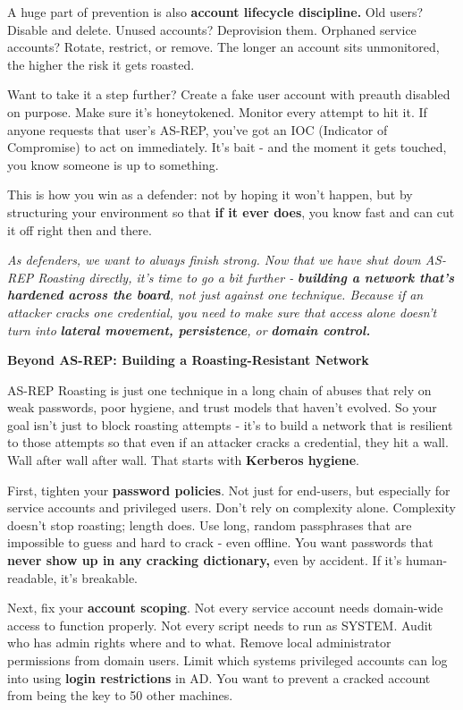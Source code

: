 A huge part of prevention is also \textbf{account lifecycle discipline. }Old users? Disable and delete. Unused accounts? Deprovision them. Orphaned service accounts? Rotate, restrict, or remove. The longer an account sits unmonitored, the higher the risk it gets roasted.

Want to take it a step further? Create a fake user account with preauth disabled on purpose. Make sure it’s honeytokened. Monitor every attempt to hit it. If anyone requests that user’s AS-REP, you’ve got an IOC (Indicator of Compromise) to act on immediately. It’s bait - and the moment it gets touched, you know someone is up to something.

This is how you win as a defender: not by hoping it won’t happen, but by structuring your environment so that \textbf{if it ever does}, you know fast and can cut it off right then and there.

\textit{As defenders, we want to always finish strong. Now that we have shut down AS-REP Roasting directly, it’s time to go a bit further - }\textit{\textbf{building a network that’s hardened across the board}}\textit{, not just against one technique. Because if an attacker cracks one credential, you need to make sure that access alone doesn’t turn into }\textit{\textbf{lateral movement, persistence}}\textit{, or }\textit{\textbf{domain control.}}

\textbf{Beyond AS-REP: Building a Roasting-Resistant Network}

AS-REP Roasting is just one technique in a long chain of abuses that rely on weak passwords, poor hygiene, and trust models that haven’t evolved. So your goal isn’t just to block roasting attempts - it’s to build a network that is resilient to those attempts so that even if an attacker cracks a credential, they hit a wall. Wall after wall after wall. That starts with \textbf{Kerberos hygiene}.

First, tighten your \textbf{password policies}. Not just for end-users, but especially for service accounts and privileged users. Don’t rely on complexity alone. Complexity doesn’t stop roasting; length does. Use long, random passphrases that are impossible to guess and hard to crack - even offline. You want passwords that \textbf{never show up in any cracking dictionary, }even by accident. If it’s human-readable, it’s breakable.

Next, fix your \textbf{account scoping}. Not every service account needs domain-wide access to function properly. Not every script needs to run as SYSTEM. Audit who has admin rights where and to what. Remove local administrator permissions from domain users. Limit which systems privileged accounts can log into using \textbf{login restrictions }in AD. You want to prevent a cracked account from being the key to 50 other machines.

